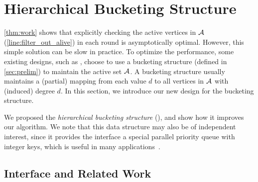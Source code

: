 \section{Hierarchical Bucketing Structure}\label{sec:bucketing}

\cref{thm:work} shows that explicitly checking the active vertices in ${\mathcal{A}}$ (\cref{line:filter_out_alive}) in each round is asymptotically optimal.
However, this simple solution can be slow in practice. 
To optimize the performance, some existing designs, 
such as \Julienne{}, choose to use a bucketing structure (defined in \cref{sec:prelim}) to maintain the active set ${\mathcal{A}}$. %
A bucketing structure usually maintains a (partial) mapping from each value $d$ to all vertices in ${\mathcal{A}}$ with (induced) degree $d$. 
In this section, we introduce our new design for the bucketing structure.  

We proposed the \emph{hierarchical bucketing structure} (\HBS), and show
how it improves our \kcore{} algorithm. 
We note that this data structure may also be of independent interest, 
since it provides the interface a special parallel priority queue with integer keys, which is useful in many applications~\cite{li2013parallel, shi2021parallel, shi2023theoretically,dhulipala2017,gbbs2021}.


\subsection{Interface and Related Work}\label{sec:bucketing-existing}

